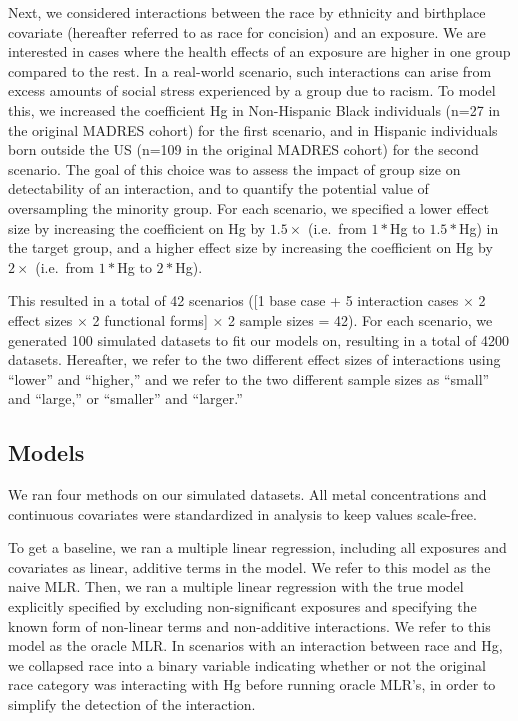 \documentclass[12pt, twoside]{amherstthesis}
\begin{document}
Next, we considered interactions between the race by ethnicity and birthplace covariate (hereafter referred to as race for concision) and an exposure. We are interested in cases where the health effects of an exposure are higher in one group compared to the rest. In a real-world scenario, such interactions can arise from excess amounts of social stress experienced by a group due to racism. To model this, we increased the coefficient Hg in Non-Hispanic Black individuals (n=27 in the original MADRES cohort) for the first scenario, and in Hispanic individuals born outside the US (n=109 in the original MADRES cohort) for the second scenario. The goal of this choice was to assess the impact of group size on detectability of an interaction, and to quantify the potential value of oversampling the minority group. For each scenario, we specified a lower effect size by increasing the coefficient on Hg by \(1.5\times\) (i.e.~from \(1*\)Hg to \(1.5*\)Hg) in the target group, and a higher effect size by increasing the coefficient on Hg by \(2\times\) (i.e.~from \(1*\)Hg to \(2*\)Hg).

This resulted in a total of 42 scenarios ({[}1 base case + 5 interaction cases \(\times\) 2 effect sizes \(\times\) 2 functional forms{]} \(\times\) 2 sample sizes = 42). For each scenario, we generated 100 simulated datasets to fit our models on, resulting in a total of 4200 datasets. Hereafter, we refer to the two different effect sizes of interactions using ``lower'' and ``higher,'' and we refer to the two different sample sizes as ``small'' and ``large,'' or ``smaller'' and ``larger.''

\hypertarget{models}{%
\subsection{Models}\label{models}}

We ran four methods on our simulated datasets. All metal concentrations and continuous covariates were standardized in analysis to keep values scale-free.

To get a baseline, we ran a multiple linear regression, including all exposures and covariates as linear, additive terms in the model. We refer to this model as the naive MLR. Then, we ran a multiple linear regression with the true model explicitly specified by excluding non-significant exposures and specifying the known form of non-linear terms and non-additive interactions. We refer to this model as the oracle MLR. In scenarios with an interaction between race and Hg, we collapsed race into a binary variable indicating whether or not the original race category was interacting with Hg before running oracle MLR's, in order to simplify the detection of the interaction.
\end{document}
